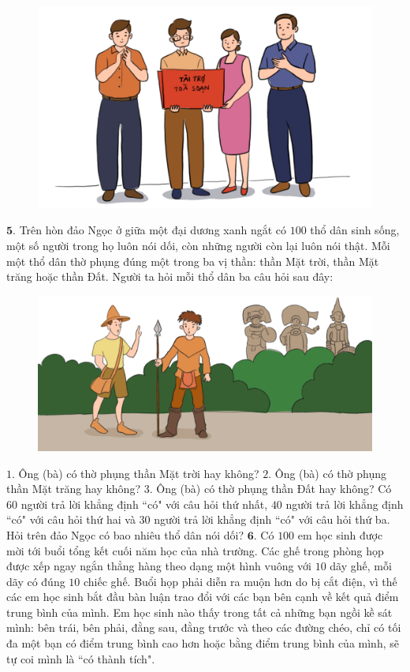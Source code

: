 \begin{multicols}{2}
\begin{figure}[H]
		\captionsetup{labelformat= empty, justification=centering}
		\includegraphics[width=0.8\linewidth]{Hinh4}
		\vspace*{-10pt}
	\end{figure}
	\vskip 0.1cm
	$\pmb{5.}$ 	Trên hòn đảo Ngọc ở giữa một đại dương xanh ngắt có $100$ thổ dân sinh sống, một số người trong họ luôn nói dối, còn những người còn lại luôn nói thật. Mỗi một thổ dân thờ phụng đúng một trong ba vị thần: thần Mặt trời, thần Mặt trăng hoặc thần Đất. Người ta hỏi mỗi thổ dân ba câu hỏi sau đây:
	\begin{figure}[H]
		\centering
		\vspace*{-5pt}
		\captionsetup{labelformat= empty, justification=centering}
		\includegraphics[width=1\linewidth]{Hinh5}
		\vspace*{-20pt}
	\end{figure}
	$1.$ Ông (bà) có thờ phụng thần Mặt trời hay không?
	\vskip 0.1cm
	$2.$ Ông (bà) có thờ phụng thần Mặt trăng hay không?
	\vskip 0.1cm
	$3.$ Ông (bà) có thờ phụng thần Đất hay không?
	\vskip 0.1cm
	Có $60$ người trả lời khẳng định ``có" với câu hỏi thứ nhất, $40$ người trả lời khẳng định ``có" với câu hỏi thứ hai và $30$ người trả lời khẳng định ``có" với câu hỏi thứ ba. Hỏi trên đảo Ngọc có bao nhiêu thổ dân nói dối?
	\vskip 0.1cm
	$\pmb{6.}$ 	Có $100$ em học sinh được mời tới buổi tổng kết cuối năm học của nhà trường. Các ghế trong phòng họp được xếp ngay ngắn thẳng hàng theo dạng một hình vuông với $10$ dãy ghế, mỗi dãy có đúng $10$ chiếc ghế. Buổi họp phải diễn ra muộn hơn do bị cắt điện, vì thế các em học sinh bắt đầu bàn luận trao đổi với các bạn bên cạnh về kết quả điểm trung bình của mình. Em học sinh nào thấy trong tất cả những bạn ngồi kề sát mình: bên trái, bên phải, đằng sau, đằng trước và theo các đường chéo, chỉ có tối đa một bạn có điểm trung bình cao hơn hoặc bằng điểm trung bình của  mình, sẽ tự coi mình là ``có thành tích".

\end{multicols}
